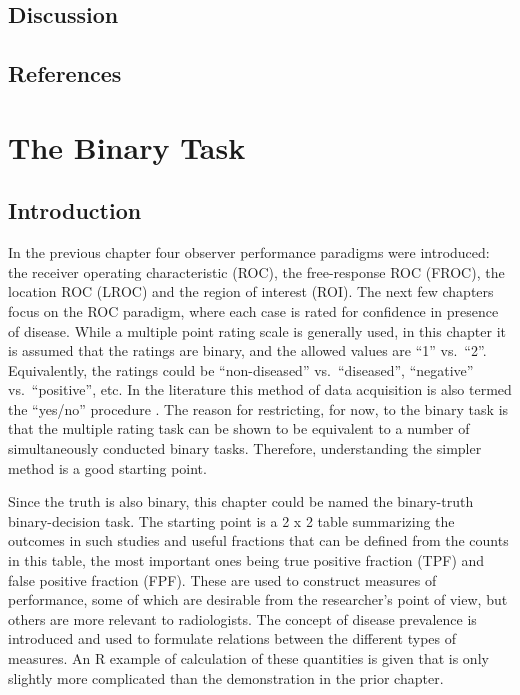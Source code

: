 \documentclass[
]{book}
\begin{document}
\hypertarget{frocdataformat-Discussion}{%
\section{Discussion}\label{frocdataformat-Discussion}}

\hypertarget{frocdataformat-references}{%
\section{References}\label{frocdataformat-references}}

\hypertarget{binaryTask0}{%
\chapter{The Binary Task}\label{binaryTask0}}

\hypertarget{binaryTask0Intro}{%
\section{Introduction}\label{binaryTask0Intro}}

In the previous chapter four observer performance paradigms were introduced: the receiver operating characteristic (ROC), the free-response ROC (FROC), the location ROC (LROC) and the region of interest (ROI). The next few chapters focus on the ROC paradigm, where each case is rated for confidence in presence of disease. While a multiple point rating scale is generally used, in this chapter it is assumed that the ratings are binary, and the allowed values are ``1'' vs.~``2''. Equivalently, the ratings could be ``non-diseased'' vs.~``diseased'', ``negative'' vs.~``positive'', etc. In the literature this method of data acquisition is also termed the ``yes/no'' procedure \citep{RN298, RN346}. The reason for restricting, for now, to the binary task is that the multiple rating task can be shown to be equivalent to a number of simultaneously conducted binary tasks. Therefore, understanding the simpler method is a good starting point.

Since the truth is also binary, this chapter could be named the binary-truth binary-decision task. The starting point is a 2 x 2 table summarizing the outcomes in such studies and useful fractions that can be defined from the counts in this table, the most important ones being true positive fraction (TPF) and false positive fraction (FPF). These are used to construct measures of performance, some of which are desirable from the researcher's point of view, but others are more relevant to radiologists. The concept of disease prevalence is introduced and used to formulate relations between the different types of measures. An R example of calculation of these quantities is given that is only slightly more complicated than the demonstration in the prior chapter.
\end{document}
